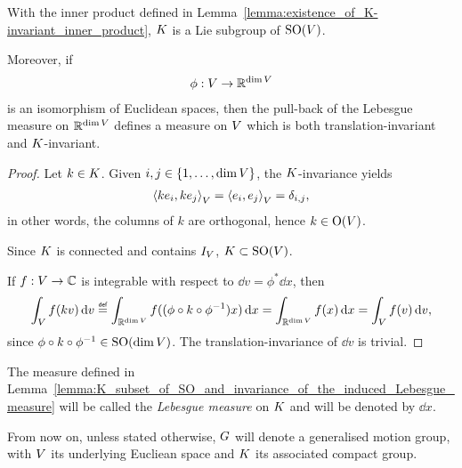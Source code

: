 \begin{lemma}
\label{lemma:K_subset_of_SO_and_invariance_of_the_induced_Lebesgue_measure}
    With the inner product defined in Lemma~\ref{lemma:existence_of_K-invariant_inner_product},
    $K$ is a Lie subgroup of ${\mathrm{SO} (V)}$.

    Moreover, if
    \begin{align*}
        \phi : V \to \mathbb{R}^{\dim V}
    \end{align*}
    is an isomorphism of Euclidean spaces,
    then the pull-back of the Lebesgue measure on $\mathbb{R}^{\dim V}$ defines a measure on $V$
    which is both translation-invariant and $K$-invariant.
\end{lemma}
\begin{proof}
    Let $k \in K$.
    Given $i, j \in \{1, \dots, \dim V\}$,
    the $K$-invariance yields
    \begin{align*}
        {{\langle k e_i, k e_j \rangle}_{V}} = {{\langle e_i, e_j \rangle}_{V}} = \delta_{i,j},
    \end{align*}
    in other words, the columns of $k$ are orthogonal, hence $k \in {\mathrm{O} (V)}$.

    Since $K$ is connected and contains ${I_{V}}$, $K \subset {\mathrm{SO} (V)}$.

    If $f : V \to \mathbb{C}$ is integrable with respect to $\dd v = \phi^* \dd x$,
    then
    \begin{align*}
        \int_\VectorSpace f(k v) \dd v \defeq \int_{\R^{\dim \VectorSpace}} f((\phi \circ k \circ \phi^{-1})x) \dd x
        = \int_{\R^{\dim \VectorSpace}} f(x) \dd x
        = \int_\VectorSpace f(v) \dd v,
    \end{align*}
    since $\phi \circ k \circ \phi^{-1} \in {\mathrm{SO} (\dim V)}$.
    The translation-invariance of $\dd v$ is trivial.
\end{proof}

\begin{definition}
    The measure defined in Lemma~\ref{lemma:K_subset_of_SO_and_invariance_of_the_induced_Lebesgue_measure}
    will be called the \emph{Lebesgue measure} on $K$ and will be denoted by $\dd x$.
\end{definition}

From now on, unless stated otherwise,
$G$ will denote a generalised motion group,
with $V$ its underlying Eucliean space and $K$ its associated compact group.

